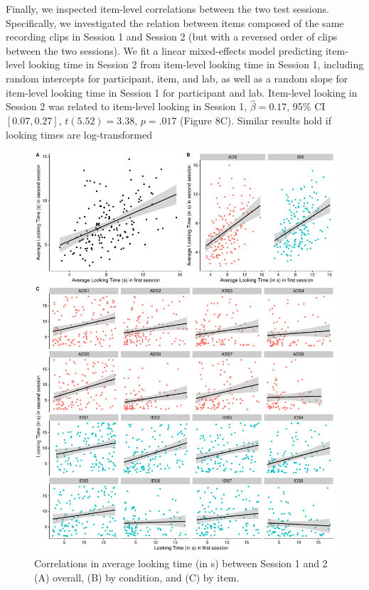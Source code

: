 \documentclass[
  man, donotrepeattitle,floatsintext]{apa6}
\begin{document}
Finally, we inspected item-level correlations between the two test sessions.
Specifically, we investigated the relation between items composed of the same recording clips in Session 1 and Session 2 (but with a reversed order of clips between the two sessions).
We fit a linear mixed-effects model predicting item-level looking time in Session 2 from item-level looking time in Session 1, including random intercepts for participant, item, and lab, as well as a random slope for item-level looking time in Session 1 for participant and lab.
Item-level looking in Session 2 was related to item-level looking in Session 1, \(\hat{\beta} = 0.17\), 95\% CI \([0.07, 0.27]\), \(t(5.52) = 3.38\), \(p = .017\) (Figure 8C).
Similar results hold if looking times are log-transformed

\begin{figure}

{\centering \includegraphics{MB1T_supplement_files/figure-latex/sfig8-1} 

}

\caption{Correlations in average looking time (in s) between Session 1 and 2 (A) overall, (B) by condition, and (C) by item.}\label{fig:sfig8}
\end{figure}
\end{document}

